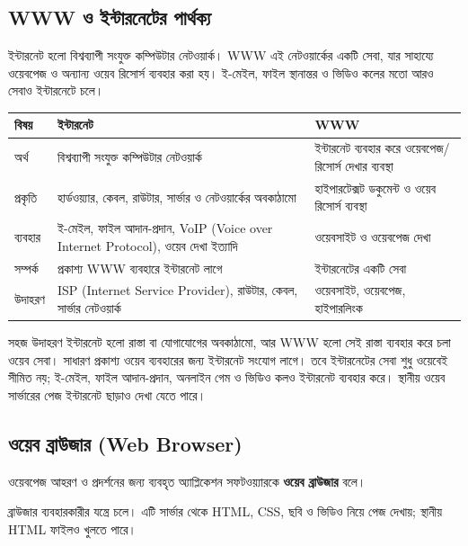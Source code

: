 \subsection{WWW ও ইন্টারনেটের পার্থক্য}

ইন্টারনেট হলো বিশ্বব্যাপী সংযুক্ত কম্পিউটার নেটওয়ার্ক। WWW এই নেটওয়ার্কের একটি সেবা, যার সাহায্যে ওয়েবপেজ ও অন্যান্য ওয়েব রিসোর্স ব্যবহার করা হয়। ই-মেইল, ফাইল স্থানান্তর ও ভিডিও কলের মতো আরও সেবাও ইন্টারনেটে চলে।

\begin{center}
\begin{tabular}{|p{}|p{}|p{}|}
\hline
\textbf{বিষয়} & \textbf{ইন্টারনেট} & \textbf{WWW} \\
\hline
অর্থ & বিশ্বব্যাপী সংযুক্ত কম্পিউটার নেটওয়ার্ক & ইন্টারনেট ব্যবহার করে ওয়েবপেজ/রিসোর্স দেখার ব্যবস্থা \\
\hline
প্রকৃতি & হার্ডওয়্যার, কেবল, রাউটার, সার্ভার ও নেটওয়ার্কের অবকাঠামো & হাইপারটেক্সট ডকুমেন্ট ও ওয়েব রিসোর্স ব্যবস্থা \\
\hline
ব্যবহার & ই-মেইল, ফাইল আদান-প্রদান, VoIP (Voice over Internet Protocol), ওয়েব দেখা ইত্যাদি & ওয়েবসাইট ও ওয়েবপেজ দেখা \\
\hline
সম্পর্ক & প্রকাশ্য WWW ব্যবহারে ইন্টারনেট লাগে & ইন্টারনেটের একটি সেবা \\
\hline
উদাহরণ & ISP (Internet Service Provider), রাউটার, কেবল, সার্ভার নেটওয়ার্ক & ওয়েবসাইট, ওয়েবপেজ, হাইপারলিংক \\
\hline
\end{tabular}
\end{center}

\begin{examplebox}{সহজ উদাহরণ}
ইন্টারনেট হলো রাস্তা বা যোগাযোগের অবকাঠামো, আর WWW হলো সেই রাস্তা ব্যবহার করে চলা ওয়েব সেবা। সাধারণ প্রকাশ্য ওয়েব ব্যবহারের জন্য ইন্টারনেট সংযোগ লাগে। তবে ইন্টারনেটের সেবা শুধু ওয়েবেই সীমিত নয়; ই-মেইল, ফাইল আদান-প্রদান, অনলাইন গেম ও ভিডিও কলও ইন্টারনেট ব্যবহার করে। স্থানীয় ওয়েব সার্ভারের পেজ ইন্টারনেট ছাড়াও দেখা যেতে পারে।
\end{examplebox}

\subsection{ওয়েব ব্রাউজার (Web Browser)}

\begin{definitionbox}{}
ওয়েবপেজ আহরণ ও প্রদর্শনের জন্য ব্যবহৃত অ্যাপ্লিকেশন সফটওয়্যারকে \textbf{ওয়েব ব্রাউজার} বলে।
\end{definitionbox}
ব্রাউজার ব্যবহারকারীর যন্ত্রে চলে। এটি সার্ভার থেকে HTML, CSS, ছবি ও ভিডিও নিয়ে পেজ দেখায়; স্থানীয় HTML ফাইলও খুলতে পারে।

